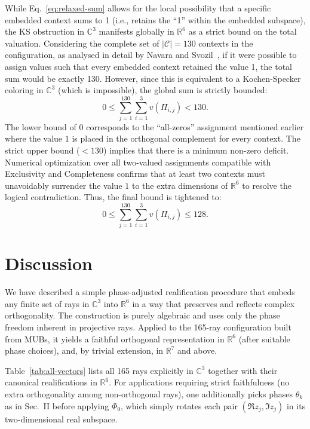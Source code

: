 \documentclass[%
  reprint,
  superscriptaddress,
  amsmath,amssymb,
  pra,
  floatfix,
  longbibliography
]{revtex4-2}
\begin{document}
While Eq.~\eqref{eq:relaxed-sum} allows for the local possibility that a specific embedded context sums to 1 (i.e., retains the ``1'' within the embedded subspace), the KS obstruction in $\mathbb{C}^3$ manifests globally in $\mathbb{R}^6$ as a strict bound on the total valuation. Considering the complete set of $|\mathcal{C}| = 130$ contexts in the configuration, as analysed in detail by Navara and Svozil~\cite{svozil-2025-MYOCHS}, if it were possible to assign values such that every embedded context retained the value 1, the total sum would be exactly 130. However, since this is equivalent to a Kochen-Specker coloring in $\mathbb{C}^3$ (which is impossible), the global sum is strictly bounded:
\begin{equation}
     0 \leq \sum_{j=1}^{130} \sum_{i=1}^3 v(\Pi_{i,j}) < 130.
\end{equation}
The lower bound of $0$ corresponds to the ``all-zeros'' assignment mentioned earlier where the value $1$ is placed in the orthogonal complement for every context. The strict upper bound ($<130$) implies that there is a minimum non-zero deficit.
Numerical optimization over all two-valued assignments compatible with Exclusivity and Completeness confirms that at least two contexts must unavoidably surrender the value $1$ to the extra dimensions of $\mathbb{R}^6$ to resolve the logical contradiction. Thus, the final bound is tightened to:
\begin{equation}
    0 \leq \sum_{j=1}^{130} \sum_{i=1}^3 v(\Pi_{i,j}) \leq 128.
\end{equation}




\section{Discussion}

We have described a simple phase-adjusted realification procedure that embeds any finite set of rays in $\mathbb{C}^3$ into $\mathbb{R}^6$ in a way that preserves and reflects complex orthogonality. The construction is purely algebraic and uses only the phase freedom inherent in projective rays. Applied to the 165-ray configuration built from MUBs, it yields a faithful orthogonal representation in $\mathbb{R}^6$ (after suitable phase choices), and, by trivial extension, in $\mathbb{R}^7$ and above.


Table~\ref{tab:all-vectors} lists all 165 rays explicitly in $\mathbb{C}^3$ together with their canonical realifications in $\mathbb{R}^6$. For applications requiring strict faithfulness (no extra orthogonality among non-orthogonal rays), one additionally picks phases $\theta_k$ as in Sec.~II before applying $\Phi_0$, which simply rotates each pair $(\Re z_j,\Im z_j)$ in its two-dimensional real subspace.
\end{document}
